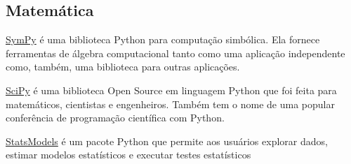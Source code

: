 \subsection{Matemática}

\underline{SymPy} é uma biblioteca Python para computação simbólica. 
Ela fornece ferramentas de álgebra computacional tanto como uma aplicação independente como, também, uma biblioteca para outras aplicações.

\underline{SciPy} é uma biblioteca Open Source em linguagem Python que foi feita para matemáticos, cientistas e engenheiros. 
Também tem o nome de uma popular conferência de programação científica com Python.

\underline{StatsModels} é um pacote Python que permite aos usuários explorar dados, estimar modelos estatísticos e executar testes estatísticos
